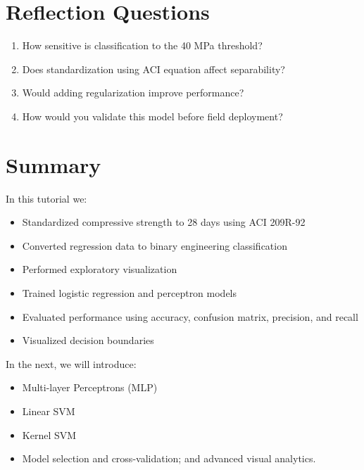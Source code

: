 \documentclass[12pt]{article}
\begin{document}
\section*{Reflection Questions}

\begin{enumerate}
    \item How sensitive is classification to the 40 MPa threshold?
    \item Does standardization using ACI equation affect separability?
    \item Would adding regularization improve performance?
    \item How would you validate this model before field deployment?
\end{enumerate}

\section*{Summary}

In this tutorial we:

\begin{itemize}
    \item Standardized compressive strength to 28 days using ACI 209R-92
    \item Converted regression data to binary engineering classification
    \item Performed exploratory visualization
    \item Trained logistic regression and perceptron models
    \item Evaluated performance using accuracy, confusion matrix, precision, and recall
    \item Visualized decision boundaries
\end{itemize}

In the next, we will introduce:

\begin{itemize}
    \item Multi-layer Perceptrons (MLP)
    \item Linear SVM
    \item Kernel SVM
    \item Model selection and cross-validation; and advanced visual analytics.
\end{itemize}
\end{document}
